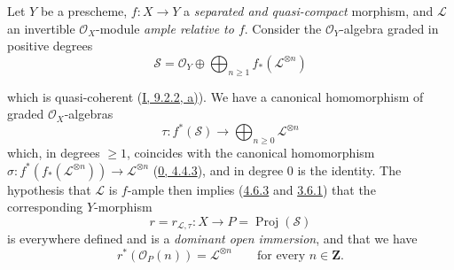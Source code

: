 \begin{env}[8.8.1]
\label{II.8.8.1}
Let $Y$ be a prescheme, $f:X\to Y$ a \emph{separated and quasi-compact}
morphism, and $\mathcal{L}$ an invertible $\mathcal{O}_X$-module \emph{ample
relative to $f$}. Consider the $\mathcal{O}_Y$-algebra graded in positive
degrees
\begin{equation}
\label{II.8.8.1.1}
  \mathcal{S}=\mathcal{O}_Y\oplus
  \bigoplus_{n\geqslant 1}f_*(\mathcal{L}^{\otimes n})
\tag{8.8.1.1}
\end{equation}

which is quasi-coherent (\hyperref[I.9.2.2]{I, 9.2.2, a)}). We have a
canonical homomorphism of graded $\mathcal{O}_X$-algebras
\begin{equation}
\label{II.8.8.1.2}
  \tau:f^*(\mathcal{S})\longrightarrow
  \bigoplus_{n\geqslant 0}\mathcal{L}^{\otimes n}
\tag{8.8.1.2}
\end{equation}
which, in degrees $\geqslant 1$, coincides with the canonical homomorphism
$\sigma:f^*(f_*(\mathcal{L}^{\otimes n}))\to\mathcal{L}^{\otimes n}$
(\hyperref[0.4.4.3]{0, 4.4.3}), and in degree $0$ is the identity.
The hypothesis that $\mathcal{L}$ is $f$-ample then implies
(\hyperref[II.4.6.3]{4.6.3} and \hyperref[II.3.6.1]{3.6.1}) that the
corresponding $Y$-morphism
\begin{equation}
\label{II.8.8.1.3}
  r=r_{\mathcal{L},\tau}:X\longrightarrow
  P=\operatorname{Proj}(\mathcal{S})
\tag{8.8.1.3}
\end{equation}
is everywhere defined and is a \emph{dominant open immersion}, and that we
have
\begin{equation}
\label{II.8.8.1.4}
  r^*(\mathcal{O}_P(n))=\mathcal{L}^{\otimes n}
  \qquad\text{for every }n\in\mathbf{Z}.
\tag{8.8.1.4}
\end{equation}
\end{env}

